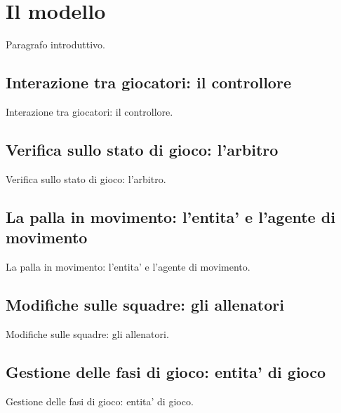
\section*{Il modello}
%
\label{sec:modello}

Paragrafo introduttivo.

\subsection*{Interazione tra giocatori: il controllore}
%
\label{sec:modello_interazione_giocatori}

Interazione tra giocatori: il controllore.

\subsection*{Verifica sullo stato di gioco: l'arbitro}
%
\label{sec:modello_verifica_arbitro}

Verifica sullo stato di gioco: l'arbitro.

\subsection*{La palla in movimento: l'entita' e l'agente di movimento}
%
\label{sec:modello_palla_agente_movimento}

La palla in movimento: l'entita' e l'agente di movimento.

\subsection*{Modifiche sulle squadre: gli allenatori}
%
\label{sec:modello_squadre_allenatori}

Modifiche sulle squadre: gli allenatori.

\subsection*{Gestione delle fasi di gioco: entita' di gioco}
%
\label{sec:modello_fasi_game_entity}

Gestione delle fasi di gioco: entita' di gioco.
